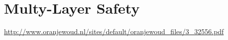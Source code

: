 \section{Multy-Layer Safety}
\url{http://www.oranjewoud.nl/sites/default/oranjewoud_files/3_32556.pdf}